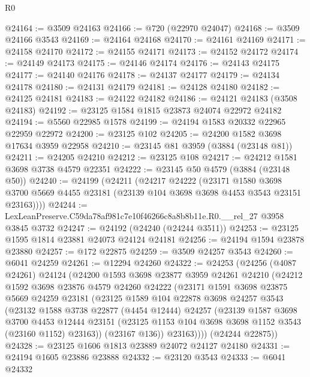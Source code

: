 \begin{lexlean}{R0}
\begin{coremodule}
@24164 := @3509 @24163
@24166 := @720 (@22970 @24047)
@24168 := @3509 @24166 @3543
@24169 := @24164 @24168
@24170 := @24161 @24169
@24171 := @24158 @24170
@24172 := @24155 @24171
@24173 := @24152 @24172
@24174 := @24149 @24173
@24175 := @24146 @24174
@24176 := @24143 @24175
@24177 := @24140 @24176
@24178 := @24137 @24177
@24179 := @24134 @24178
@24180 := @24131 @24179
@24181 := @24128 @24180
@24182 := @24125 @24181
@24183 := @24122 @24182
@24186 := @24121 @24183 (@3508 @24183)
@24192 := @23125 @1584 @1815 @23873 @24074 @22972 @24182
@24194 := @5560 @22985 @1578
@24199 := @24194 @1583 @20332 @22965 @22959 @22972
@24200 := @23125 @102
@24205 := @24200 @1582 @3698 @17634 @3959 @22958
@24210 := @23145 @81 @3959 (@3884 (@23148 @81))
@24211 := @24205 @24210
@24212 := @23125 @108
@24217 := @24212 @1581 @3698 @3738 @4579 @22351
@24222 := @23145 @50 @4579 (@3884 (@23148 @50))
@24240 := @24199
    (@24211
      (@24217
        @24222
        (@23171
          @1580
          @3698
          @3700
          @5669
          @4455
          @23181
          (@23139 @104 @3698 @3698 @4453 @3543 @23151 @23163))))
@24244 := LexLeanPreserve.C59da78af981c7e10f46266c8a8b8b11e.R0.__rel_27 @3958 @3845 @3732
@24247 := @24192 (@24240 (@24244 @3511))
@24253 := @23125 @1595 @1814 @23881 @24073 @24124 @24181
@24256 := @24194 @1594 @23878 @23880
@24257 := @172 @22875
@24259 := @3509 @24257 @3543
@24260 := @6041 @24259
@24261 := @12294 @24260
@24322 := @24253
    (@24256
      (@4087 @24261)
      @24124
      (@24200
        @1593
        @3698
        @23877
        @3959
        @24261
        @24210
        (@24212
          @1592
          @3698
          @23876
          @4579
          @24260
          @24222
          (@23171
            @1591
            @3698
            @23875
            @5669
            @24259
            @23181
            (@23125
              @1589
              @104
              @22878
              @3698
              @24257
              @3543
              (@23132
                @1588
                @3738
                @22877
                (@4454 @12444)
                @24257
                (@23139
                  @1587
                  @3698
                  @3700
                  @4453
                  @12444
                  @23151
                  (@23125 @1153 @104 @3698 @3698 @1152 @3543 (@23160 @1152) @23163))
                (@23167 @136))
              @23163))))
      (@24244 @22875))
@24328 := @23125 @1606 @1813 @23889 @24072 @24127 @24180
@24331 := @24194 @1605 @23886 @23888
@24332 := @23120 @3543
@24333 := @6041 @24332

\end{coremodule}
\end{lexlean}
